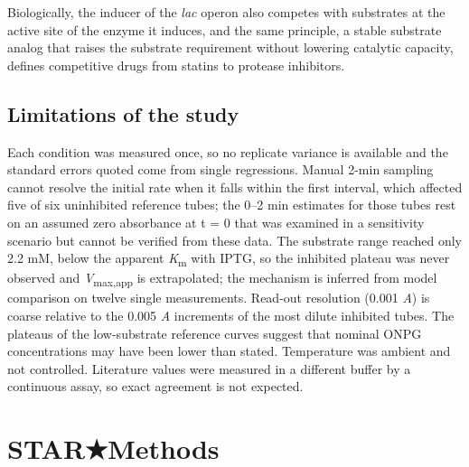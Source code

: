\documentclass[9pt,twocolumn]{extarticle}
\newcommand{\Km}{\textit{K}\textsubscript{m}}
\newcommand{\Vmaxapp}{\textit{V}\textsubscript{max,app}}
\newcommand{\lac}{\textit{lac}}
\newcommand{\starsym}{{\dejavu ★}}
\newcommand{\dash}{–}
\begin{document}
Biologically, the inducer of the \lac{} operon also competes with substrates at the active site of the enzyme it induces, and the same principle, a stable substrate analog that raises the substrate requirement without lowering catalytic capacity, defines competitive drugs from statins to protease inhibitors.

\subsection{Limitations of the study}
Each condition was measured once, so no replicate variance is available and the standard errors quoted come from single regressions. Manual 2-min sampling cannot resolve the initial rate when it falls within the first interval, which affected five of six uninhibited reference tubes; the 0\dash 2 min estimates for those tubes rest on an assumed zero absorbance at t = 0 that was examined in a sensitivity scenario but cannot be verified from these data. The substrate range reached only 2.2 mM, below the apparent \Km{} with IPTG, so the inhibited plateau was never observed and \Vmaxapp{} is extrapolated; the mechanism is inferred from model comparison on twelve single measurements. Read-out resolution (0.001 \textit{A}) is coarse relative to the 0.005 \textit{A} increments of the most dilute inhibited tubes. The plateaus of the low-substrate reference curves suggest that nominal ONPG concentrations may have been lower than stated. Temperature was ambient and not controlled. Literature values were measured in a different buffer by a continuous assay, so exact agreement is not expected.

\section{STAR\starsym Methods}
\end{document}
